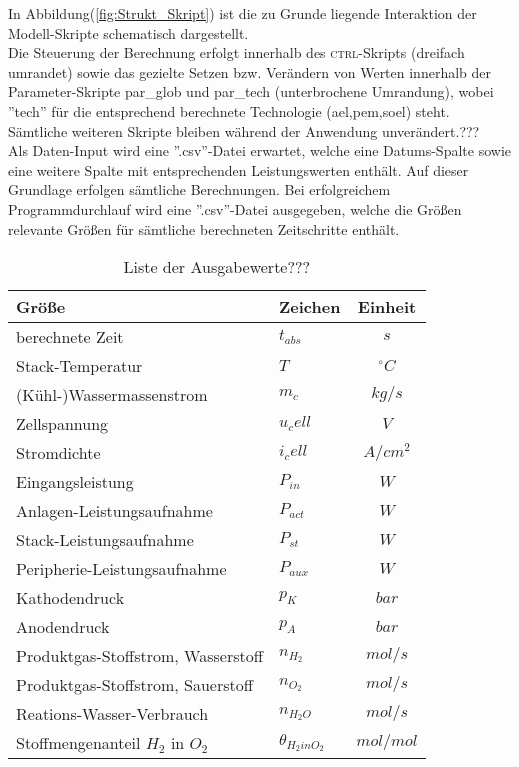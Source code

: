 \documentclass[onecolumn,10pt,titlepage]{article}
\begin{document}
In Abbildung(\ref{fig:Strukt_Skript}) ist die zu Grunde liegende Interaktion der Modell-Skripte schematisch dargestellt.\\
Die Steuerung der Berechnung erfolgt innerhalb des \textsc{ctrl}-Skripts (dreifach umrandet) sowie das gezielte Setzen bzw. Verändern von Werten innerhalb der Parameter-Skripte par\_glob und par\_tech (unterbrochene Umrandung), wobei ''tech'' für die entsprechend berechnete Technologie (\gls{ael},\gls{pem},\gls{soel}) steht. Sämtliche weiteren Skripte bleiben während der Anwendung unverändert.??? \\
Als Daten-Input wird eine ''.csv''-Datei erwartet, welche  eine Datums-Spalte sowie eine weitere Spalte mit entsprechenden Leistungswerten enthält. Auf dieser Grundlage erfolgen sämtliche Berechnungen. Bei erfolgreichem Programmdurchlauf wird eine ''.csv''-Datei ausgegeben, welche die Größen relevante Größen für sämtliche berechneten Zeitschritte enthält.

\begin{table}
	\caption{Liste der Ausgabewerte???}
	\begin{tabular}{llc}
		Größe&Zeichen&Einheit\\
		\hline
		\hline
		berechnete Zeit&$t_{abs}$ 	&$s$\\
		Stack-Temperatur&$T$ 		& $^\circ C$\\
		(Kühl-)Wassermassenstrom&$m_c$		&$kg/s$\\
		Zellspannung&$u_cell$	&$V$\\
		Stromdichte&$i_cell$	&$A/cm^2$\\
		Eingangsleistung&$P_{in}$	&$W$\\
		Anlagen-Leistungsaufnahme&$P_{act}$	&$W$\\
		Stack-Leistungsaufnahme&$P_{st}$	&$W$\\
		Peripherie-Leistungsaufnahme&$P_{aux}$	&$W$\\
		Kathodendruck&$p_K$		&$bar$\\
		Anodendruck&$p_A$		&$bar$\\
		Produktgas-Stoffstrom, Wasserstoff&$n_{H_2}$	&$mol/s$\\
		Produktgas-Stoffstrom, Sauerstoff & $n_{O_2}$		&$mol/s$\\
		Reations-Wasser-Verbrauch&$n_{H_{2}O}$&$mol/s$\\
		Stoffmengenanteil $H_2$ in $O_2$&$\theta_{H_2inO_2}$&$mol/mol$\\
		
	\end{tabular}
	\label{tab: Ausgabewerte}
\end{table}
\end{document}
